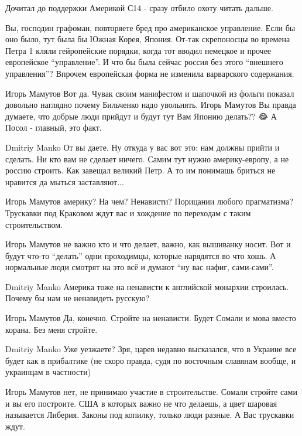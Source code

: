 \begin{itemize}

Дочитал до поддержки Америкой С14 - сразу отбило охоту читать дальше.

Вы, господин графоман, повторяете бред про американское управление. Если бы оно
было, тут была бы Южная Корея, Япония.  От-так скрепоносцы во времена Петра 1
кляли гейропейские порядки, когда тот вводил немецкое и прочее европейское
\enquote{управление}. И что бы была сейчас россия без этого \enquote{внешнего управления}?
Впрочем европейская форма не изменила варварского содержания.

\begin{itemize}
Игорь Мамутов Вот да. Чувак своим манифестом и шапочкой из фольги показал довольно наглядно почему Бильченко надо увольнять.
Игорь Мамутов Вы правда думаете, что добрые люди прийдут и будут тут Вам Японию делать?? 😂 А Посол - главный, это факт.

Dmitriy Manko От вы даете. Ну откуда у вас вот это: нам должны прийти и сделать.
Ни кто вам не сделает ничего. Самим тут нужно америку-европу, а не россию строить. Как завещал великий Петр.
А то им понимашь бриться не нравится да мыться заставляют...

Игорь Мамутов америку? На чем? Ненависти? Порицании любого прагматизма? Трускавки под Краковом ждут вас и хождение по переходам с таким строительством.

Игорь Мамутов не важно кто и что делает, важно, как вышиванку носит. Вот и
будут что-то \enquote{делать} одни проходимцы, которые нарядятся во что хошь. А
нормальные люди смотрят на это всё и думают \enquote{ну вас нафиг, сами-сами}.

Dmitriy Manko Америка тоже на ненависти к английской монархии строилась. Почему бы нам не ненавидеть русскую?

Игорь Мамутов Да, конечно. Стройте на ненависти. Будет Сомали и мова вместо корана. Без меня стройте.

Dmitriy Manko Уже уезжаете? Зря, царев недавно высказался, что в Украине все
будет как в прибалтике (не скоро правда, судя по восточным славянам вообще, и
украинцам в частности)

Игорь Мамутов нет, не принимаю участие в строительстве. Сомали стройте сами и
вы его построите. США в которых важно не что делаешь, а цвет шаровая называется
Либерия. Законы под копилку, только люди разные. А Вас трускавки ждут.


\end{itemize}
\end{itemize}
